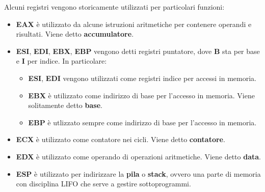 \documentclass[a4paper,11pt]{article}
\begin{document}
Alcuni registri vengono storicamente utilizzati per particolari funzioni:
\begin{itemize}
	\item \textbf{EAX} è utilizzato da alcune istruzioni aritmetiche per contenere operandi e risultati. Viene detto \textbf{accumulatore}.
	\item \textbf{ESI}, \textbf{EDI}, \textbf{EBX}, \textbf{EBP} vengono detti registri puntatore, dove \textbf{B} sta per base e \textbf{I} per indice. In particolare:
		\begin{itemize}
			\item \textbf{ESI}, \textbf{EDI} vengono utilizzati come registri indice per accessi in memoria.
			\item \textbf{EBX} è utilizzato come indirizzo di base per l'accesso in memoria. Viene solitamente detto \textbf{base}.
			\item \textbf{EBP} è utlizzato sempre come indirizzo di base per l'accesso in memoria.
		\end{itemize}
	\item \textbf{ECX} è utilizzato come contatore nei cicli. Viene detto \textbf{contatore}.
	\item \textbf{EDX} è utilizzato come operando di operazioni aritmetiche. Viene detto \textbf{data}.
	\item \textbf{ESP} è utilizzato per indirizzare la \textbf{pila} o \textbf{stack}, ovvero una parte di memoria con disciplina LIFO che serve a gestire sottoprogrammi.
\end{itemize}
\end{document}
